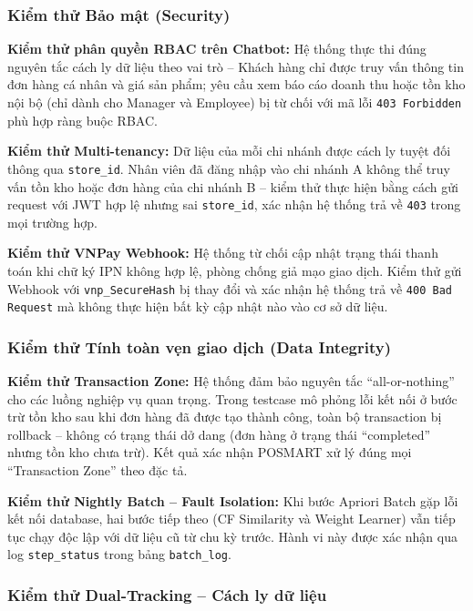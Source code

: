 \documentclass[12pt,a4paper]{report}
\begin{document}
\subsubsection{Kiểm thử Bảo mật (Security)}

\textbf{Kiểm thử phân quyền RBAC trên Chatbot:} Hệ thống thực thi đúng nguyên tắc cách ly dữ liệu theo vai trò -- Khách hàng chỉ được truy vấn thông tin đơn hàng cá nhân và giá sản phẩm; yêu cầu xem báo cáo doanh thu hoặc tồn kho nội bộ (chỉ dành cho Manager và Employee) bị từ chối với mã lỗi \texttt{403 Forbidden} phù hợp ràng buộc RBAC.

\textbf{Kiểm thử Multi-tenancy:} Dữ liệu của mỗi chi nhánh được cách ly tuyệt đối thông qua \texttt{store\_id}. Nhân viên đã đăng nhập vào chi nhánh A không thể truy vấn tồn kho hoặc đơn hàng của chi nhánh B -- kiểm thử thực hiện bằng cách gửi request với JWT hợp lệ nhưng sai \texttt{store\_id}, xác nhận hệ thống trả về \texttt{403} trong mọi trường hợp.

\textbf{Kiểm thử VNPay Webhook:} Hệ thống từ chối cập nhật trạng thái thanh toán khi chữ ký IPN không hợp lệ, phòng chống giả mạo giao dịch. Kiểm thử gửi Webhook với \texttt{vnp\_SecureHash} bị thay đổi và xác nhận hệ thống trả về \texttt{400 Bad Request} mà không thực hiện bất kỳ cập nhật nào vào cơ sở dữ liệu.

\subsubsection{Kiểm thử Tính toàn vẹn giao dịch (Data Integrity)}

\textbf{Kiểm thử Transaction Zone:} Hệ thống đảm bảo nguyên tắc ``all-or-nothing'' cho các luồng nghiệp vụ quan trọng. Trong testcase mô phỏng lỗi kết nối ở bước trừ tồn kho sau khi đơn hàng đã được tạo thành công, toàn bộ transaction bị rollback -- không có trạng thái dở dang (đơn hàng ở trạng thái ``completed'' nhưng tồn kho chưa trừ). Kết quả xác nhận POSMART xử lý đúng mọi ``Transaction Zone'' theo đặc tả.

\textbf{Kiểm thử Nightly Batch -- Fault Isolation:} Khi bước Apriori Batch gặp lỗi kết nối database, hai bước tiếp theo (CF Similarity và Weight Learner) vẫn tiếp tục chạy độc lập với dữ liệu cũ từ chu kỳ trước. Hành vi này được xác nhận qua log \texttt{step\_status} trong bảng \texttt{batch\_log}.

\subsubsection{Kiểm thử Dual-Tracking -- Cách ly dữ liệu}
\end{document}
